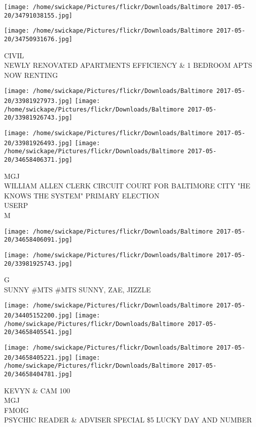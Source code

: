 \documentclass[10pt,letterpaper]{article}
\begin{document}
\texttt{[image: /home/swickape/Pictures/flickr/Downloads/Baltimore 2017-05-20/34791038155.jpg]}

\vspace{0.25in}
\texttt{[image: /home/swickape/Pictures/flickr/Downloads/Baltimore 2017-05-20/34750931676.jpg]}

CIVIL\\
NEWLY RENOVATED APARTMENTS EFFICIENCY \& 1 BEDROOM APTS NOW RENTING
\pagebreak

\texttt{[image: /home/swickape/Pictures/flickr/Downloads/Baltimore 2017-05-20/33981927973.jpg]}
\texttt{[image: /home/swickape/Pictures/flickr/Downloads/Baltimore 2017-05-20/33981926743.jpg]}

\texttt{[image: /home/swickape/Pictures/flickr/Downloads/Baltimore 2017-05-20/33981926493.jpg]}
\texttt{[image: /home/swickape/Pictures/flickr/Downloads/Baltimore 2017-05-20/34658406371.jpg]}

MGJ\\
WILLIAM ALLEN CLERK CIRCUIT COURT FOR BALTIMORE CITY "HE KNOWS THE SYSTEM" PRIMARY ELECTION\\
USERP\\
M
\pagebreak

\texttt{[image: /home/swickape/Pictures/flickr/Downloads/Baltimore 2017-05-20/34658406091.jpg]}

\vspace{0.25in}
\texttt{[image: /home/swickape/Pictures/flickr/Downloads/Baltimore 2017-05-20/33981925743.jpg]}

G\\
SUNNY \#MTS \#MTS SUNNY, ZAE, JIZZLE
\pagebreak

\texttt{[image: /home/swickape/Pictures/flickr/Downloads/Baltimore 2017-05-20/34405152200.jpg]}
\texttt{[image: /home/swickape/Pictures/flickr/Downloads/Baltimore 2017-05-20/34658405541.jpg]}

\texttt{[image: /home/swickape/Pictures/flickr/Downloads/Baltimore 2017-05-20/34658405221.jpg]}
\texttt{[image: /home/swickape/Pictures/flickr/Downloads/Baltimore 2017-05-20/34658404781.jpg]}

KEVYN \& CAM 100\\
MGJ\\
FMOIG\\
PSYCHIC READER \& ADVISER SPECIAL \$5 LUCKY DAY AND NUMBER
\pagebreak
\end{document}
